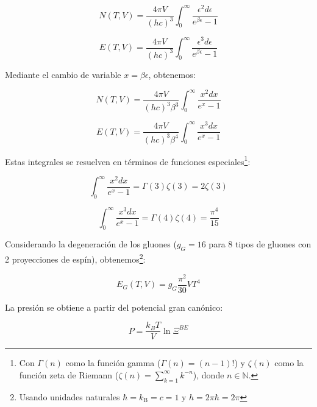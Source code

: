 \begin{equation}\label{eq-BE-Ntotalintnofug}
N(T,V) = \frac{4\pi V}{(hc)^3} \int_0^\infty \frac{\epsilon^2 d\epsilon}{e^{\beta\epsilon}-1}
\end{equation}

\begin{equation}\label{eq-BE-Etotalintnofug}
E(T,V) = \frac{4\pi V}{(hc)^3} \int_0^\infty \frac{\epsilon^3 d\epsilon}{e^{\beta\epsilon}-1}
\end{equation}

Mediante el cambio de variable $x=\beta\epsilon$, obtenemos:

\begin{equation}\label{eq-BE-Ntotalintnofug-x}
N(T,V) = \frac{4\pi V}{(hc)^3 \beta^3} \int_0^\infty \frac{x^2 dx}{e^x-1}
\end{equation}

\begin{equation}\label{eq-BE-Etotalintnofug-x}
E(T,V) = \frac{4\pi V}{(hc)^3 \beta^4} \int_0^\infty \frac{x^3 dx}{e^x-1}
\end{equation}

Estas integrales se resuelven en términos de funciones especiales\footnote{Con $\Gamma(n)$ como la función gamma ($\Gamma(n) = (n-1)!$) 
y $\zeta(n)$ como la función zeta de Riemann 
($\zeta(n) = \sum_{k=1}^\infty k^{-n}$), donde $n \in \mathbb{N}$.}:

\begin{equation}\label{eq-sol-int-N}
    \int_0^\infty \frac{x^2 dx}{e^x-1} = \Gamma(3)\zeta(3) = 2\zeta(3)
\end{equation}

\begin{equation}\label{eq-sol-int-E}
    \int_0^\infty \frac{x^3 dx}{e^x-1} = \Gamma(4)\zeta(4) = \frac{\pi^4}{15}
\end{equation}

Considerando la degeneración de los gluones ($g_G = 16$ para 8 tipos de gluones con 2 proyecciones de espín), obtenemos\footnote{Usando unidades naturales $\hbar={k}_{\mathrm{B}}=c=1$ y $h=2\pi \hbar = 2\pi$}:

\begin{equation}\label{eq-BE-Etotalgluons}
E_G(T,V) = g_G \frac{\pi^2}{30} V T^4
\end{equation}

La presión se obtiene a partir del potencial gran canónico:

\begin{equation}\label{eq-BE-P1}
P = \frac{k_B T}{V} \ln \Xi^{BE}
\end{equation}

